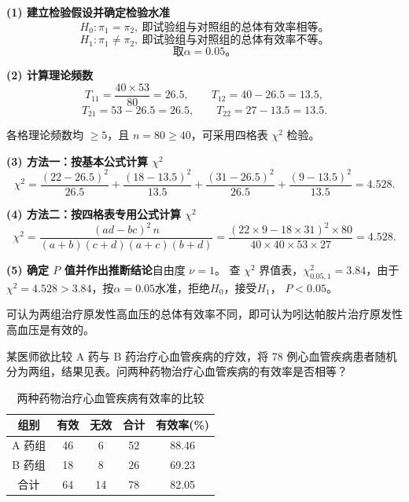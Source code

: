 \documentclass[lang=cn,10pt]{elegantbook}
\begin{document}
\begin{solution}
\textbf{(1) 建立检验假设并确定检验水准}
\[
  H_0:\pi_1=\pi_2,~即试验组与对照组的总体有效率相等。
\]
\[
H_1:\pi_1\ne\pi_2,~即试验组与对照组的总体有效率不等。
\]
\[
取 \alpha=0.05。
\]

\textbf{(2) 计算理论频数}\quad
\[
  T_{11}=\frac{40\times 53}{80}=26.5,\qquad T_{12}=40-26.5=13.5,
\]
\[
  T_{21}=53-26.5=26.5,\qquad T_{22}=27-13.5=13.5.
\]

各格理论频数均 $\ge 5$，且 $n=80\ge 40$，可采用四格表 $\chi^2$ 检验。

\textbf{(3) 方法一：按基本公式计算 $\chi^2$}\quad
\begin{equation}
  \chi^2=\frac{(22-26.5)^2}{26.5}+\frac{(18-13.5)^2}{13.5}+\frac{(31-26.5)^2}{26.5}+\frac{(9-13.5)^2}{13.5}=4.528.
\end{equation}

\textbf{(4) 方法二：按四格表专用公式计算 $\chi^2$}\quad
\begin{equation}
  \chi^2=\frac{(ad-bc)^2\,n}{(a+b)(c+d)(a+c)(b+d)}
  =\frac{(22\times 9-18\times 31)^2\times 80}{40\times 40\times 53\times 27}=4.528.
\end{equation}

\textbf{(5) 确定 $P$ 值并作出推断结论}\quad 自由度 $\nu=1$。
查 $\chi^2$ 界值表，$\chi^2_{0.05,1}=3.84$，由于 $\chi^2=4.528>3.84$，按$\alpha=0.05$水准，拒绝$H_0$，接受$H_1$， $P<0.05$。

可认为两组治疗原发性高血压的总体有效率不同，即可认为吲达帕胺片治疗原发性高血压是有效的。
\end{solution}
\vspace{0.2cm}
\begin{exercise}
某医师欲比较 A 药与 B 药治疗心血管疾病的疗效，将 78 例心血管疾病患者随机分为两组，结果见表。问两种药物治疗心血管疾病的有效率是否相等？

\begin{table}[htbp]
\centering
\caption*{两种药物治疗心血管疾病有效率的比较}
\begin{tabular}{ccccc}
  \hline
  组别 & 有效 & 无效 & 合计 & 有效率(\%) \\
  \hline
  A 药组 & 46 & 6 & 52 & 88.46 \\
  B 药组 & 18 & 8 & 26 & 69.23 \\
  \hline
  合计 & 64 & 14 & 78 & 82.05 \\
  \hline
\end{tabular}
\end{table}
\end{exercise}
\end{document}
